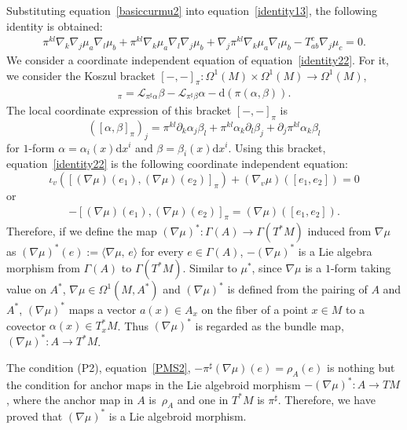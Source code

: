 \documentclass[10pt,a4paper]{amsart}
\numberwithin{equation}{section}
\newcommand{\calL}{{\mathcal L}}
\newcommand{\rhoa}{{\rho_A}}
\newcommand{\bracket}[2]{\langle #1,\,#2\rangle}
\newcommand{\rd}{\mathrm{d}}
\begin{document}
Substituting equation~\eqref{basiccurmu2} into equation~\eqref{identity13},
the following identity is obtained:
\begin{gather}
 \pi^{kl} \nabla_k \nabla_j \mu_a \nabla_l \mu_b
+ \pi^{kl} \nabla_k \mu_a \nabla_l \nabla_j \mu_b
+ \nabla_j \pi^{kl} \nabla_k \mu_a \nabla_l \mu_b
- T_{ab}^c \nabla_j \mu_c =0.
\label{identity22}
\end{gather}
We consider a coordinate independent equation of equation~\eqref{identity22}.
For it, we consider
the Koszul bracket $[-,-]_{\pi}\colon\Omega^1(M) \times \Omega^1(M)
\rightarrow \Omega^1(M)$,
\begin{gather}
[\alpha, \beta]_{\pi} =
\calL_{\pi^{\sharp} \alpha} \beta - \calL_{\pi^{\sharp} \beta} \alpha
- \rd (\pi(\alpha, \beta)).
\label{Koszulbracket}
\end{gather}
The local coordinate expression of this bracket $[-, -]_{\pi}$ is
\[
([\alpha, \beta]_{\pi})_j
=
\pi^{kl} \partial_k \alpha_j \beta_l
+ \pi^{kl} \alpha_k \partial_l \beta_j
+ \partial_j \pi^{kl} \alpha_k \beta_l
\]
for $1$-form $\alpha = \alpha_i(x) \rd x^i$ and $\beta = \beta_i(x) \rd x^i$.
Using this bracket, equation~\eqref{identity22} is
the following coordinate independent equation:
\[
\iota_v ([(\nabla \mu)(e_1), (\nabla \mu)(e_2)]_{\pi}{})
+ (\nabla_{v} \mu)([e_1, e_2])
=0
\]
or
\begin{gather}
- [(\nabla \mu)(e_1), (\nabla \mu)(e_2)]_{\pi}
= (\nabla \mu)([e_1, e_2]).
\label{identity34}
\end{gather}
Therefore, if we define the map $(\nabla \mu)^*\colon \Gamma(A) \rightarrow \Gamma(T^*M)$ induced from $\nabla \mu$ as
$(\nabla \mu)^*(e) := \bracket{\nabla \mu}{e}$ for every $e \in \Gamma(A)$,
$-(\nabla \mu)^*$ is a Lie algebra morphism from $\Gamma(A)$ to $\Gamma(T^*M)$.
Similar to $\mu^*$,
since $\nabla \mu$ is a $1$-form taking value on $A^*$,
$\nabla \mu \in \Omega^1(M, A^*)$ and $(\nabla \mu)^*$ is defined from
the pairing of $A$ and $A^*$, $(\nabla \mu)^*$ maps a vector
$a(x) \in A_x$ on the fiber of a point $x \in M$ to a covector
$\alpha(x) \in T^*_x M$. Thus $(\nabla \mu)^*$ is regarded as
the bundle map, $(\nabla \mu)^*\colon A \rightarrow T^*M$.


The condition (P2), equation~\eqref{PMS2},
$- \pi^{\sharp} (\nabla \mu)(e) = \rhoa(e)$
is nothing but the condition for anchor maps in the Lie algebroid morphism
$-(\nabla \mu)^*\colon A \rightarrow TM$,
where the anchor map in $A$ is~$\rhoa$ and one in $T^*M$ is $\pi^{\sharp}$.
Therefore, we have proved that $(\nabla \mu)^*$ is a Lie algebroid morphism.
\end{document}
